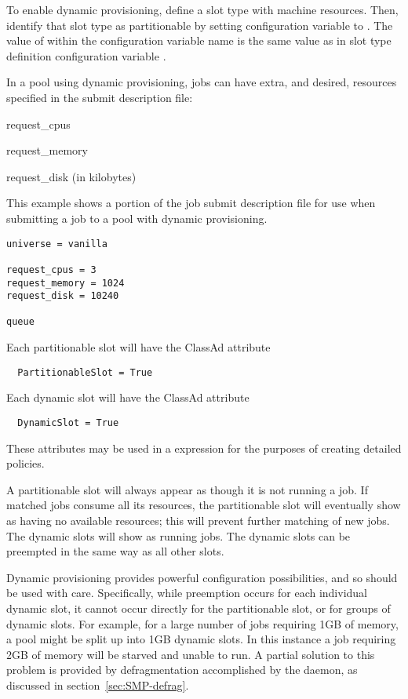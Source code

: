 To enable dynamic provisioning, 
define a slot type with machine resources.
Then,
identify that slot type as partitionable by setting
configuration variable 
to .
The value of  within the configuration variable name
is the same value as in slot type definition configuration variable
.

In a pool using dynamic provisioning, 
jobs can have extra, and desired, resources specified in the submit
description file:
\begin{description}
  \item{request\_cpus}
  \item{request\_memory}
  \item{request\_disk (in kilobytes)}
\end{description}

This example shows a portion of the job submit description file
for use when submitting a job to a pool with dynamic provisioning.
\begin{verbatim}
universe = vanilla

request_cpus = 3
request_memory = 1024
request_disk = 10240

queue 
\end{verbatim}

Each partitionable slot will have
the ClassAd attribute
\begin{verbatim}
  PartitionableSlot = True
\end{verbatim}
Each dynamic slot will have the ClassAd attribute 
\begin{verbatim}
  DynamicSlot = True
\end{verbatim}
These attributes may be used in a  expression for 
the purposes of creating detailed policies.

A partitionable slot will always appear as though it is not running a job.
If matched jobs consume all its resources,
the partitionable slot  will eventually show as having no available resources; 
this will prevent further matching of new jobs.
The dynamic slots will show as running jobs.
The dynamic slots can be preempted in the same way as all other slots.

Dynamic provisioning provides powerful configuration
possibilities, and so should be used with care. 
Specifically, while preemption occurs for each individual dynamic slot,
it cannot occur directly for the partitionable slot, 
or for groups of dynamic slots. 
For example, for a large number of jobs requiring 1GB of memory,
a pool might be split up into 1GB dynamic slots. 
In this instance a job requiring 2GB of memory will be starved
and unable to run.  A partial solution to this problem is provided
by defragmentation accomplished by the  daemon,
as discussed in section~\ref{sec:SMP-defrag}.

